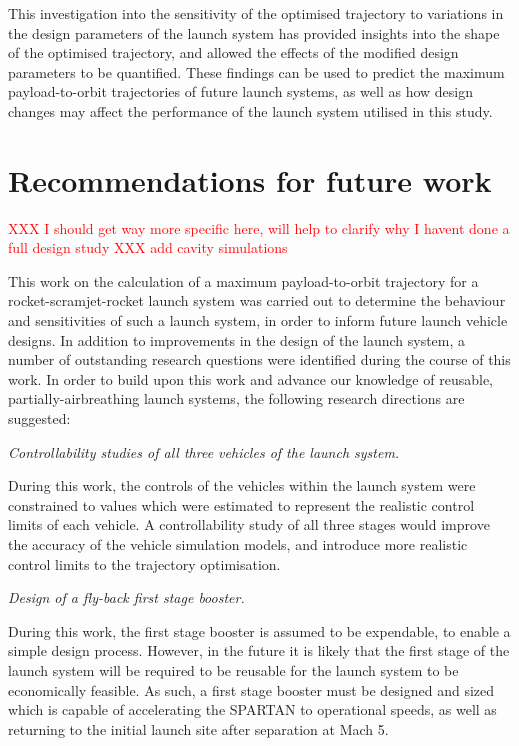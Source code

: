 This investigation into the sensitivity of the optimised trajectory to variations in the design parameters of the launch system has provided insights into the shape of the optimised trajectory, and allowed the effects of the modified design parameters to be quantified. These findings can be used to predict the maximum payload-to-orbit trajectories of future launch systems, as well as how design changes may affect the performance of the launch system utilised in this study. 

  \chapter{Recommendations for future work}
  \textcolor{red}{XXX I should get way more specific here, will help to clarify why I havent done a full design study}
  \textcolor{red}{XXX add cavity simulations}
  	
 This work on the calculation of a maximum payload-to-orbit trajectory for a rocket-scramjet-rocket launch system was carried out to determine the behaviour and sensitivities of such a launch system, in order to inform future launch vehicle designs. 
 In addition to improvements in the design of the launch system, a number of outstanding research questions were identified during the course of this work.
 In order to build upon this work and advance our knowledge of reusable, partially-airbreathing launch systems, the following research directions are suggested:

\vspace{10pt}
\textit{Controllability studies of all three vehicles of the launch system.}

 \noindent
During this work, the controls of the vehicles within the launch system were constrained to values which were estimated to represent the realistic control limits of each vehicle. 
A controllability study of all three stages would improve the accuracy of the vehicle simulation models, and introduce more realistic control limits to the trajectory optimisation. 

\vspace{10pt}
 \textit{Design of a fly-back first stage booster.}
 
 \noindent
 During this work, the first stage booster is assumed to be expendable, to enable a simple design process. However, in the future it is likely that the first stage of the launch system will be required to be reusable for the launch system to be economically feasible. As such, a first stage booster must be designed and sized which is capable of accelerating the SPARTAN to operational speeds, as well as returning to the initial launch site after separation at Mach 5. 

